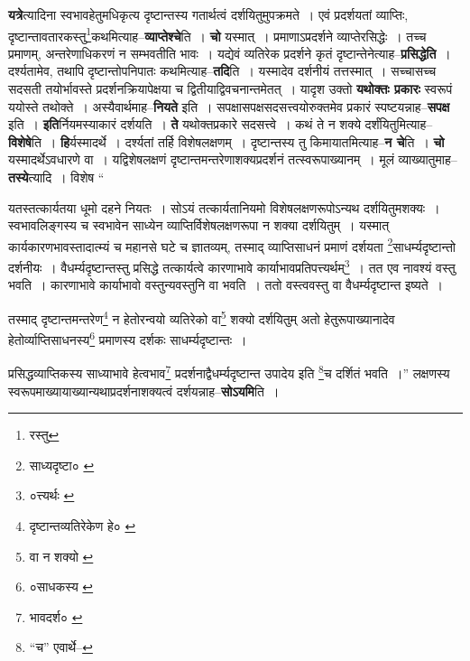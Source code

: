 \documentclass[article,12pt,a4paper]{memoir}
\begin{document}
	  \pstart \textbf{यत्रे}त्यादिना स्वभावहेतुमधिकृत्य दृष्टान्तस्य गतार्थत्वं दर्शयितुमुपक्रमते । एवं प्रदर्शयतां व्याप्तिः, दृष्टान्तावतारकस्तु\footnote{रस्तु}कथमित्याह--\textbf{व्याप्तेश्चे}ति । \textbf{चो} यस्मात् । प्रमाणाऽप्रदर्शने व्याप्तेरसिद्धेः । तच्च प्रमाणम्, अन्तरेणाधिकरणं न सम्भवतीति भावः । यद्येवं व्यतिरेक \leavevmode{} प्रदर्शने कृतं दृष्टान्तेनेत्याह--\textbf{प्रसिद्धेति} । दर्श्यतामेव, तथापि दृष्टान्तोपनिपातः कथमित्याह--\textbf{तदि}ति । यस्मादेव दर्शनीयं तत्तस्मात् । सच्चासच्च सदसती तयोर्भावस्ते प्रदर्शनक्रियापेक्षया च द्वितीयाद्विवचनान्तमेतत् । यादृश उक्तो \textbf{यथोक्तः प्रकारः} स्वरूपं ययोस्ते तथोक्ते । अस्यैवार्थमाह--\textbf{नियते} इति । सपक्षासपक्षसदसत्त्वयोरुक्तमेव प्रकारं स्पष्टयन्नाह--\textbf{सपक्ष} इति । \textbf{इति}र्नियमस्याकारं दर्शयति । \textbf{ते} यथोक्तप्रकारे सदसत्त्वे । कथं ते न शक्ये दर्शंयितुमित्याह--\textbf{विशेषे}ति । \textbf{हि}र्यस्मादर्थे । दर्श्यतां तर्हि विशेषलक्षणम् । दृष्टान्तस्य तु किमायातमित्याह--\textbf{न चे}ति । \textbf{चो} यस्मादर्थेऽवधारणे वा । यद्विशेषलक्षणं दृष्टान्तमन्तरेणाशक्यप्रदर्शनं तत्स्वरूपाख्यानम् । मूलं व्याख्यातुमाह--\textbf{तस्ये}त्यादि । विशेष  \leavevmode{} “
	  
	यतस्तत्कार्यतया धूमो दहने नियतः । सोऽयं तत्कार्यतानियमो विशेषलक्षणरूपोऽन्यथ दर्शयितुमशक्यः । स्वभावलिङ्गस्य च स्वभावेन साध्येन व्याप्तिर्विशेषलक्षणरूपा न शक्या दर्शयितुम् । यस्मात् कार्यकारणभावस्तादात्म्यं च महानसे घटे च ज्ञातव्यम्, तस्माद् व्याप्तिसाधनं प्रमाणं दर्शयता \footnote{साध्यदृष्टा० \cite{dp-msB}}साधर्म्यदृष्टान्तो दर्शनीयः । वैधर्म्यदृष्टान्तस्तु प्रसिद्धे तत्कार्यत्वे कारणाभावे कार्याभावप्रतिपत्त्यर्थम्\footnote{०त्त्यर्थः \cite{dp-edE}} । तत एव नावश्यं वस्तु भवति । कारणाभावे कार्याभावो वस्तुन्यवस्तुनि वा भवति । ततो वस्त्ववस्तु वा वैधर्म्यदृष्टान्त इष्यते । 
	  
	तस्माद् दृष्टान्तमन्तरेण\footnote{दृष्टान्तव्यतिरेकेण हे० \cite{dp-msA} \cite{dp-edP} \cite{dp-edH} \cite{dp-edE} \cite{dp-edN}} न हेतोरन्वयो व्यतिरेको वा\footnote{वा न शक्यो \cite{dp-msA} \cite{dp-edP} \cite{dp-edH} \cite{dp-edE} \cite{dp-edN}} शक्यो दर्शयितुम् अतो हेतुरूपाख्यानादेव हेतोर्व्याप्तिसाधनस्य\footnote{०साधकस्य \cite{dp-edE}} प्रमाणस्य दर्शकः साधर्म्यदृष्टान्तः । 
	  
	प्रसिद्धव्याप्तिकस्य साध्याभावे हेत्वभाव\footnote{भावदर्श० \cite{dp-msC} \cite{dp-msD}} प्रदर्शनाद्वैधर्म्यदृष्टान्त उपादेय इति \footnote{“च” एवार्थे--\cite{dp-msD-n}}च दर्शितं भवति ।” लक्षणस्य स्वरूपमाख्यायाख्यान्यथाप्रदर्शनाशक्यत्वं दर्शयन्नाह--\textbf{सोऽयमि}ति ।
	\pend
      
\end{document}
